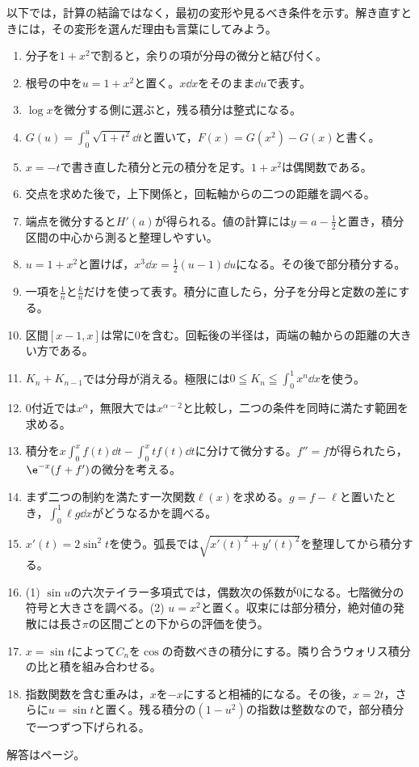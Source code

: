 以下では，計算の結論ではなく，最初の変形や見るべき条件を示す。解き直すときには，その変形を選んだ理由も言葉にしてみよう。

\begin{enumerate}[label=\textbf{\thechapter.\arabic*},leftmargin=*]
 \item 分子を$1+x^2$で割ると，余りの項が分母の微分と結び付く。
 \item 根号の中を$u=1+x^2$と置く。$x\dd x$をそのまま$\dd u$で表す。
 \item $\log x$を微分する側に選ぶと，残る積分は整式になる。
 \item $G(u)=\int_0^u\sqrt{1+t^2}\dd t$と置いて，$F(x)=G(x^2)-G(x)$と書く。
 \item $x=-t$で書き直した積分と元の積分を足す。$1+x^2$は偶関数である。
 \item 交点を求めた後で，上下関係と，回転軸からの二つの距離を調べる。
 \item 端点を微分すると$H'(a)$が得られる。値の計算には$y=a-\frac12$と置き，積分区間の中心から測ると整理しやすい。
 \item $u=1+x^2$と置けば，$x^3\dd x=\frac12(u-1)\dd u$になる。その後で部分積分する。
 \item 一項を$\frac1n$と$\frac{k}{n}$だけを使って表す。積分に直したら，分子を分母と定数の差にする。
 \item 区間$[x-1,x]$は常に$0$を含む。回転後の半径は，両端の軸からの距離の大きい方である。
 \item $K_n+K_{n-1}$では分母が消える。極限には$0\leqq K_n\leqq\int_0^1x^n\dd x$を使う。
 \item $0$付近では$x^\alpha$，無限大では$x^{\alpha-2}$と比較し，二つの条件を同時に満たす範囲を求める。
 \item 積分を$x\int_0^xf(t)\dd t-\int_0^xtf(t)\dd t$に分けて微分する。$f''=f$が得られたら，$\e^{-x}(f+f')$の微分を考える。
 \item まず二つの制約を満たす一次関数$\ell(x)$を求める。$g=f-\ell$と置いたとき，$\int_0^1\ell g\dd x$がどうなるかを調べる。
 \item $x'(t)=2\sin^2t$を使う。弧長では$\sqrt{x'(t)^2+y'(t)^2}$を整理してから積分する。
 \item (1) $\sin u$の六次テイラー多項式では，偶数次の係数が$0$になる。七階微分の符号と大きさを調べる。(2) $u=x^2$と置く。収束には部分積分，絶対値の発散には長さ$\pi$の区間ごとの下からの評価を使う。
 \item $x=\sin t$によって$C_n$を$\cos$の奇数べきの積分にする。隣り合うウォリス積分の比と積を組み合わせる。
 \item 指数関数を含む重みは，$x$を$-x$にすると相補的になる。その後，$x=2t$，さらに$u=\sin t$と置く。残る積分の$(1-u^2)$の指数は整数なので，部分積分で一つずつ下げられる。
\end{enumerate}

\smallskip\noindent 解答は\pageref{解答:第12章}ページ。
